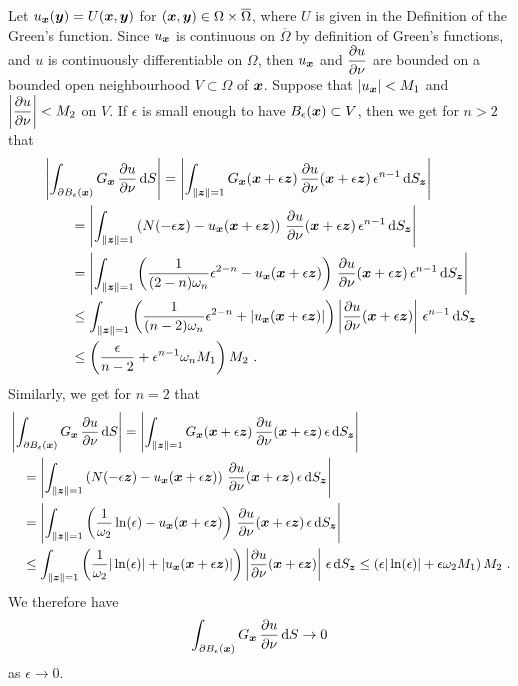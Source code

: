 Let $u_{{\bm{x}}}({\bm{y}}) = U({\bm{x}},{\bm{y}})$ for
$({\bm{x}},{\bm{y}}) \in \Omega \times \overline{\Omega}$, where $U$ is
given in the Definition of the Green's function.
Since $u_{{\bm{x}}}$ is continuous on $\overline{\Omega}$ by definition
of Green's functions, and $u$ is continuously differentiable on
$\Omega$, then $u_{{\bm{x}}}$ and $\displaystyle \frac{\partial{u}}{\partial \nu}$
are bounded on a bounded open neighbourhood $V \subset \Omega$ of
${\bm{x}}$.  Suppose that $|u_{{\bm{x}}}| < M_1$ and
$\displaystyle \left| \frac{\partial{u}}{\partial \nu} \right| < M_2$ on $V$.
If $\epsilon$ is small enough to have $B_\epsilon({\bm{x}}) \subset V$,
then we get for $n>2$ that
\begin{align*}
&\left|\int_{\partial B_{\epsilon}({\bm{x}})}
G_{{\bm{x}}}\,\frac{\partial{u}}{\partial \nu} \,\mathrm{d}{S}\right|
= \left| \int_{\|{\bm{z}}\|=1}
G_{{\bm{x}}}({\bm{x}}+\epsilon {\bm{z}})
\,\frac{\partial{u}}{\partial \nu}({\bm{x}}+\epsilon {\bm{z}})
\, \epsilon^{n-1} \,\mathrm{d}{S}_{{\bm{z}}} \right| \\
&\qquad = \left| \int_{\|{\bm{z}}\|=1}
\left( N(-\epsilon{\bm{z}}) - u_{{\bm{x}}}({\bm{x}} + \epsilon {\bm{z}}) \right)
\,\frac{\partial{u}}{\partial \nu}({\bm{x}}+\epsilon {\bm{z}})
\,\epsilon^{n-1} \,\mathrm{d}{S}_{{\bm{z}}} \right| \\
&\qquad = \left| \int_{\|{\bm{z}}\|=1}
\left( \frac{1}{(2-n)\omega_n} \epsilon^{2-n} -
u_{{\bm{x}}}({\bm{x}} + \epsilon {\bm{z}})  \right)
\,\frac{\partial{u}}{\partial \nu}({\bm{x}} + \epsilon {\bm{z}})
\, \epsilon^{n-1} \,\mathrm{d}{S}_{{\bm{z}}} \right| \\
&\qquad \leq \int_{\|{\bm{z}}\|=1}
\left( \frac{1}{(n-2)\omega_n} \epsilon^{2-n} +
\left| u_{{\bm{x}}}({\bm{x}} + \epsilon {\bm{z}}) \right| \right)
\left| \frac{\partial{u}}{\partial \nu}({\bm{x}} + \epsilon {\bm{z}})
\right|\, \epsilon^{n-1} \,\mathrm{d}{S}_{{\bm{z}}} \\
& \qquad \leq \left(\frac{\epsilon}{n-2} +
\epsilon^{n-1} \omega_n M_1\right) M_2 \ . 
\end{align*}
Similarly, we get for $n=2$ that
\begin{align*}
&\left|\int_{\partial B_{\epsilon}({\bm{x}})}
G_{{\bm{x}}}\,\frac{\partial{u}}{\partial \nu} \,\mathrm{d}{S}\right|
=\left| \int_{\|{\bm{z}}\|=1}
G_{{\bm{x}}}({\bm{x}}+\epsilon {\bm{z}})
\,\frac{\partial{u}}{\partial \nu}({\bm{x}}+\epsilon {\bm{z}})
\, \epsilon \,\mathrm{d}{S}_{{\bm{z}}} \right| \\
&\quad = \left| \int_{\|{\bm{z}}\|=1}
\left( N(-\epsilon{\bm{z}}) - u_{{\bm{x}}}({\bm{x}} + \epsilon {\bm{z}}) \right)
\,\frac{\partial{u}}{\partial \nu}({\bm{x}}+\epsilon {\bm{z}})
\, \epsilon \,\mathrm{d}{S}_{{\bm{z}}} \right| \\
&\quad = \left| \int_{\|{\bm{z}}\|=1}
\left( \frac{1}{\omega_2} \ln(\epsilon) -
u_{{\bm{x}}}({\bm{x}} + \epsilon {\bm{z}}) \right)
\,\frac{\partial{u}}{\partial \nu}({\bm{x}} + \epsilon {\bm{z}})
\, \epsilon \,\mathrm{d}{S}_{{\bm{z}}} \right| \\
&\quad \leq \int_{\|{\bm{z}}\|=1}
\left( \frac{1}{\omega_2} |\ln(\epsilon)|  +
\left| u_{{\bm{x}}}({\bm{x}} + \epsilon {\bm{z}}) \right| \right)
\left| \frac{\partial{u}}{\partial \nu}({\bm{x}} + \epsilon {\bm{z}})
\right|\, \epsilon \,\mathrm{d}{S}_{{\bm{z}}}
\leq \left( \epsilon |\ln(\epsilon)| + \epsilon \omega_2 M_1 \right) M_2 \ . 
\end{align*}
We therefore have
\[
\int_{\partial B_{\epsilon}({\bm{x}})}
G_{{\bm{x}}}\,\frac{\partial{u}}{\partial \nu} \,\mathrm{d}{S} \to 0
\]
as $\epsilon \to 0$.

